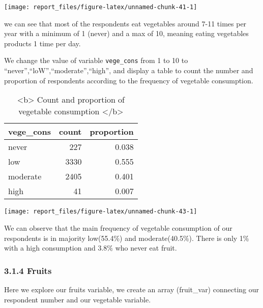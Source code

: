 \documentclass[
]{article}
\begin{document}
\begin{center}\texttt{[image: report\_files/figure-latex/unnamed-chunk-41-1]} \end{center}

we can see that most of the respondents eat vegetables around 7-11 times
per year with a minimum of 1 (never) and a max of 10, meaning eating
vegetables products 1 time per day.

We change the value of variable \texttt{vege\_cons} from 1 to 10 to
``never'',``loW'',``moderate'',``high'', and display a table to count
the number and proportion of respondents according to the frequency of
vegetable consumption.

\begin{table}

\caption{\label{tab:unnamed-chunk-43}<b> Count and proportion of vegetable consumption </b>}
\centering
\begin{tabular}[t]{l|r|r}
\hline
vege\_cons & count & proportion\\
\hline
never & 227 & 0.038\\
\hline
low & 3330 & 0.555\\
\hline
moderate & 2405 & 0.401\\
\hline
high & 41 & 0.007\\
\hline
\end{tabular}
\end{table}

\begin{center}\texttt{[image: report\_files/figure-latex/unnamed-chunk-43-1]} \end{center}

We can observe that the main frequency of vegetable consumption of our
respondents is in majority low(55.4\%) and moderate(40.5\%). There is
only 1\% with a high consumption and 3.8\% who never eat fruit.

\hypertarget{fruits}{%
\subsubsection{3.1.4 Fruits}\label{fruits}}

Here we explore our fruits variable, we create an array (fruit\_var)
connecting our respondent number and our vegetable variable.
\end{document}
